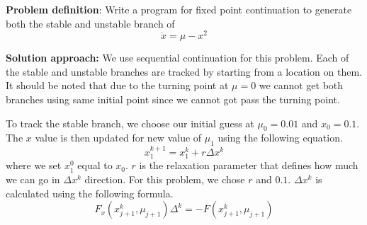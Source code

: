 \textbf{Problem definition}:
Write a program for fixed point continuation to generate both the stable and unstable branch of
%
\begin{equation}\label{eq:Q1_GE}
	\dot{x} = \mu - x^2
\end{equation}
%
\noindent\hrulefill

\textbf{Solution approach:}
We use sequential continuation for this problem. Each of the stable and unstable branches are tracked by starting from a location on them. It should be noted that due to the turning point at $\mu = 0$ we cannot get both branches using same initial point since we cannot got pass the turning point.

To track the stable branch, we choose our initial guess at $\mu_0 = 0.01$ and $x_0 = 0.1$. The $x$ value is then updated for new value of $\mu_1$ using the following equation.
%
\begin{equation}
	x_1^{k+1} = x_1^{k} + r \Delta x^k
\end{equation}
%
where we set $x_1^0$ equal to $x_0$. $r$ is the relaxation parameter that defines how much we can go in $\Delta x^k$ direction. For this problem, we chose $r$ and $0.1$. $\Delta x^k$ is calculated using the following formula.
%
\begin{equation}
	F_x \left( x_{j+1}^k, \mu_{j+1} \right) \Delta^k = 
	-F \left( x_{j+1}^k, \mu_{j+1} \right)
\end{equation}
%


